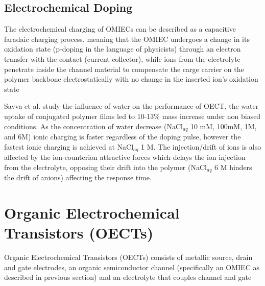 
\subsection{Electrochemical Doping}

The electrochemical charging of OMIECs can be described as a capacitive faradaic charging process,
meaning that the OMIEC undergoes a change in its oxidation state (p-doping in the language of physicists) through an electron transfer with the contact (current collector), while ions from the electrolyte penetrate inside the channel material to compensate the carge carrier on the polymer backbone electrostatically with no change in the inserted ion's oxidation state \cite{giovannittiEnergeticControlRedoxActive2020}  

Savva et al. study the influence of water on the performance of OECT, the water uptake of conjugated polymer films led to 10-13\% mass increase under non biased conditions. As the concentration of water decrease (NaCl$_{aq}$ 10 mM, 100mM, 1M, and 6M) ionic charging is faster regardless of the doping pulse, however the fastest ionic charging is achieved at NaCl$_{aq}$ 1 M. The injection/drift of ions is also affected by the ion-counterion attractive forces which delays the ion injection from the electrolyte, opposing their drift into the polymer (NaCl$_{aq}$ 6 M hinders the drift of anions) affecting the response time. \cite{savvaInfluenceWaterPerformance2019}

\section{Organic Electrochemical Transistors (OECTs)}

Organic Electrochemical Transistors (OECTs) consists of metallic source, drain and gate electrodes, an organic semiconductor channel (specifically an OMIEC as described in previous section) and an electrolyte that couples channel and gate \cite{rivnayOrganicElectrochemicalTransistors2018}

